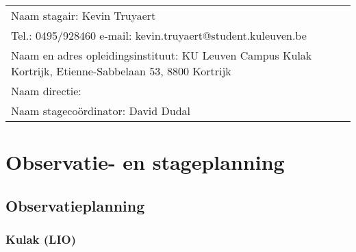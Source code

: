 
\begin{landscape}
	
	\begin{tabularx}{1.56\textwidth}{|X|}
		\hline
		Naam stagair:  Kevin Truyaert  \\
		Tel.: 0495/928460 \hspace{3cm} e-mail: kevin.truyaert@student.kuleuven.be  \\
		Naam en adres opleidingsinstituut:  KU Leuven Campus Kulak Kortrijk, Etienne-Sabbelaan 53, 8800 Kortrijk  \\
		Naam directie: \\
		Naam stagecoördinator:  David Dudal \\
		\hline
	\end{tabularx}
	\vspace*{-0.4cm}
\section{Observatie- en stageplanning}

\vspace*{-0.3cm}\subsection{Observatieplanning}
\subsubsection{Kulak (LIO)}

	\begin{minipage}[b]{0.5\textwidth}
		
	\end{minipage}


\end{landscape}
